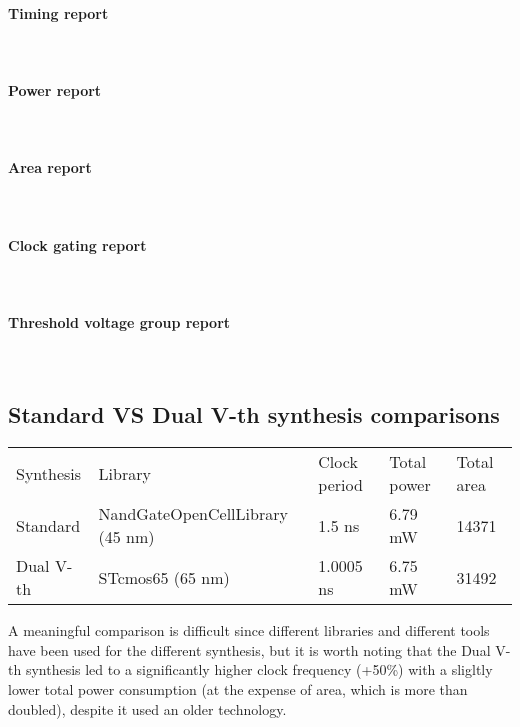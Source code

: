 \paragraph{Timing report} \mbox{} \\

\paragraph{Power report} \mbox{} \\

\paragraph{Area report} \mbox{} \\

\paragraph{Clock gating report} \mbox{} \\

\paragraph{Threshold voltage group report} \mbox{} \\


\subsection{Standard VS Dual V-th synthesis comparisons}
\begin{table}[H]
	\centering
	\begin{tabular}{lllll}
		\hline
		\rowcolor{gray!50}
		Synthesis & Library & Clock period & Total power & Total area \\
		Standard & NandGateOpenCellLibrary (45 nm) & 1.5 ns & 6.79 mW & 14371 \\
		\rowcolor{gray!25}
		Dual V-th & STcmos65 (65 nm) & 1.0005 ns & 6.75 mW & 31492 \\
		\hline
	\end{tabular}
	\label{tab:syn_cmp}
\end{table}

A meaningful comparison is difficult since different libraries and different
tools have been used for the different synthesis, but it is worth noting that
the Dual V-th synthesis led to a significantly higher clock frequency (+50\%)
with a sligltly lower total power consumption (at the expense of area, which is
more than doubled), despite it used an older technology.

